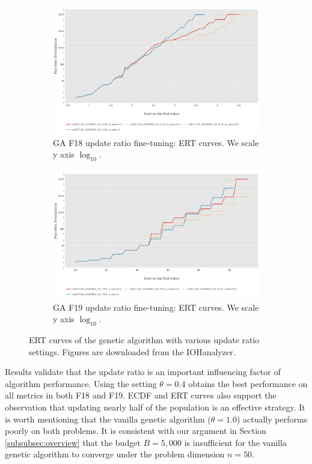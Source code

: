 \documentclass{article}
\begin{document}
\begin{figure}[!ht]
    \centering
    \begin{subfigure}[h]{0.95\linewidth}
        \includegraphics[width=\linewidth]{ga/f18/urate_ert.png}
        \caption{GA F18 update ratio fine-tuning: ERT curves. We scale y axis $\log_{10}$.}
    \end{subfigure}
    \hfill
    \begin{subfigure}[h]{0.95\linewidth}
        \includegraphics[width=\linewidth]{ga/f19/urate_ert.png}
        \caption{GA F19 update ratio fine-tuning: ERT curves. We scale y axis $\log_{10}$.}
    \end{subfigure}
    \caption{ERT curves of the genetic algorithm with various update ratio settings. Figures are downloaded from the IOHanalyzer.}
    \label{fig:experi-ga-urate-ert}
\end{figure}

Results validate that the update ratio is an important influencing factor of algorithm performance. Using the setting $\theta = 0.4$ obtains the best performance on all metrics in both F18 and F19. ECDF and ERT curves also support the observation that updating nearly half of the population is an effective strategy. It is worth mentioning that the vanilla genetic algorithm ($\theta = 1.0$) actually performs poorly on both problems. It is consistent with our argument in Section \ref{subsubsec:overview} that the budget $B = 5,000$ is insufficient for the vanilla genetic algorithm to converge under the problem dimension $n = 50$.
\end{document}
